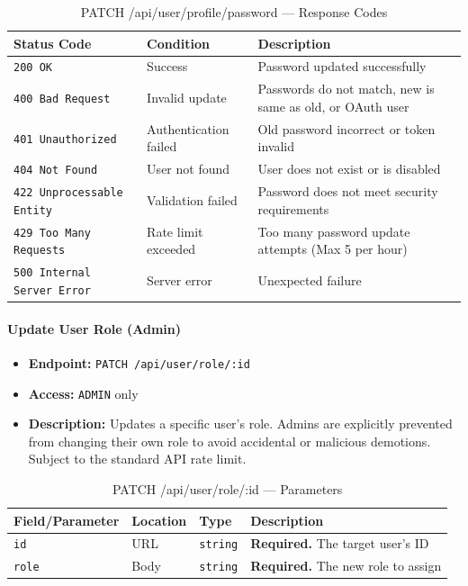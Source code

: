 \begin{table}[H]
\centering
\renewcommand{\arraystretch}{1.3}
\begin{tabularx}{\textwidth}{|l|l|X|}
\hline
\textbf{Status Code} & \textbf{Condition} & \textbf{Description} \\
\hline
\texttt{200 OK}           & Success              & Password updated successfully \\
\hline
\texttt{400 Bad Request}  & Invalid update       & Passwords do not match, new is same as old, or OAuth user \\
\hline
\texttt{401 Unauthorized} & Authentication failed & Old password incorrect or token invalid \\
\hline
\texttt{404 Not Found}    & User not found       & User does not exist or is disabled \\
\hline
\texttt{422 Unprocessable Entity} & Validation failed & Password does not meet security requirements \\
\hline
\texttt{429 Too Many Requests} & Rate limit exceeded & Too many password update attempts (Max 5 per hour) \\
\hline
\texttt{500 Internal Server Error} & Server error & Unexpected failure \\
\hline
\end{tabularx}
\caption{PATCH /api/user/profile/password — Response Codes}
\label{tab:update-my-password-responses}
\end{table}
\FloatBarrier

\paragraph{Update User Role (Admin)}
\label{subsubsec:update-user-role}

\begin{itemize}
  \item \textbf{Endpoint:} \texttt{PATCH /api/user/role/:id}
  \item \textbf{Access:} \texttt{ADMIN} only
  \item \textbf{Description:} Updates a specific user's role. Admins are explicitly prevented from changing their own role to avoid accidental or malicious demotions. Subject to the standard API rate limit.
\end{itemize}

\begin{table}[H]
\centering
\renewcommand{\arraystretch}{1.3}
\begin{tabularx}{\textwidth}{|l|l|l|X|}
\hline
\textbf{Field/Parameter} & \textbf{Location} & \textbf{Type} & \textbf{Description} \\
\hline
\texttt{id}   & URL  & \texttt{string} & \textbf{Required.} The target user's ID \\
\hline
\texttt{role} & Body & \texttt{string} & \textbf{Required.} The new role to assign \\
\hline
\end{tabularx}
\caption{PATCH /api/user/role/:id — Parameters}
\label{tab:update-user-role-params}
\end{table}

